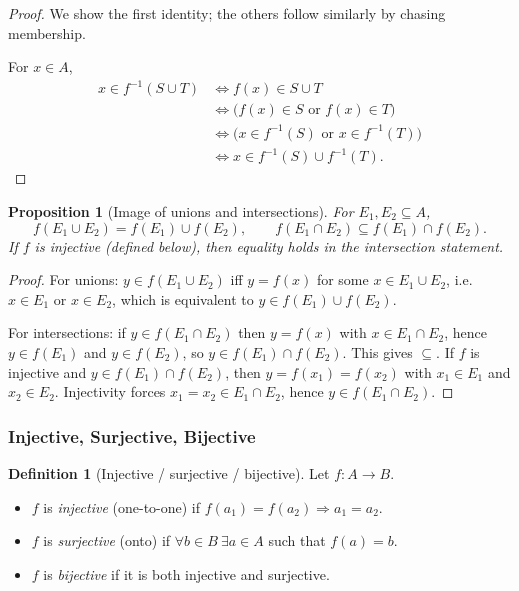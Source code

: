 \documentclass[12pt]{article}
\numberwithin{equation}{section}
\theoremstyle{plain}
\newtheorem{proposition}[theorem]{Proposition}
\theoremstyle{definition}
\newtheorem{definition}[theorem]{Definition}
\theoremstyle{remark}
\begin{document}
\begin{proof}
We show the first identity; the others follow similarly by chasing membership.

For $x\in A$,
\begin{align*}
x \in f^{-1}(S\cup T)
&\Longleftrightarrow f(x) \in S\cup T \\
&\Longleftrightarrow \bigl(f(x) \in S \text{ or } f(x) \in T\bigr) \\
&\Longleftrightarrow \bigl(x \in f^{-1}(S) \text{ or } x \in f^{-1}(T)\bigr) \\
&\Longleftrightarrow x \in f^{-1}(S) \cup f^{-1}(T).
\end{align*}
\end{proof}

\begin{proposition}[Image of unions and intersections]\label{prop:image}
For $E_1,E_2\subseteq A$,
\[
f(E_1\cup E_2) = f(E_1)\cup f(E_2),
\qquad
f(E_1\cap E_2) \subseteq f(E_1)\cap f(E_2).
\]
If $f$ is injective (defined below), then equality holds in the intersection statement.
\end{proposition}

\begin{proof}
For unions: $y\in f(E_1\cup E_2)$ iff $y=f(x)$ for some $x\in E_1\cup E_2$, i.e.\ $x\in E_1$ or $x\in E_2$, which is equivalent to $y\in f(E_1)\cup f(E_2)$.

For intersections: if $y\in f(E_1\cap E_2)$ then $y=f(x)$ with $x\in E_1\cap E_2$, hence $y\in f(E_1)$ and $y\in f(E_2)$, so $y\in f(E_1)\cap f(E_2)$. This gives $\subseteq$.  
If $f$ is injective and $y\in f(E_1)\cap f(E_2)$, then $y=f(x_1)=f(x_2)$ with $x_1\in E_1$ and $x_2\in E_2$. Injectivity forces $x_1=x_2\in E_1\cap E_2$, hence $y\in f(E_1\cap E_2)$.
\end{proof}

\subsubsection{Injective, Surjective, Bijective}

\begin{definition}[Injective / surjective / bijective]
Let $f:A\to B$.
\begin{itemize}
  \item $f$ is \emph{injective} (one-to-one) if $f(a_1)=f(a_2)\Rightarrow a_1=a_2$.
  \item $f$ is \emph{surjective} (onto) if $\forall b\in B\ \exists a\in A$ such that $f(a)=b$.
  \item $f$ is \emph{bijective} if it is both injective and surjective.
\end{itemize}
\end{definition}
\end{document}
